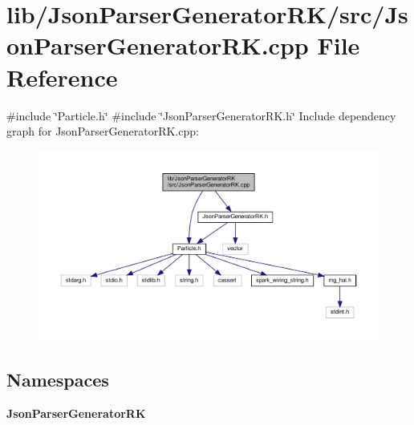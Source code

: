 \section{lib/\+Json\+Parser\+Generator\+R\+K/src/\+Json\+Parser\+Generator\+RK.cpp File Reference}
\label{_json_parser_generator_r_k_8cpp}
{\ttfamily \#include \char`\"{}Particle.\+h\char`\"{}}\newline
{\ttfamily \#include \char`\"{}Json\+Parser\+Generator\+R\+K.\+h\char`\"{}}\newline
Include dependency graph for Json\+Parser\+Generator\+R\+K.\+cpp\+:\nopagebreak
\begin{figure}[H]
\begin{center}
\leavevmode
\includegraphics[width=350pt]{_json_parser_generator_r_k_8cpp__incl}
\end{center}
\end{figure}
\subsection*{Namespaces}
\begin{DoxyCompactItemize}
\item 
 \textbf{ Json\+Parser\+Generator\+RK}
\end{DoxyCompactItemize}
